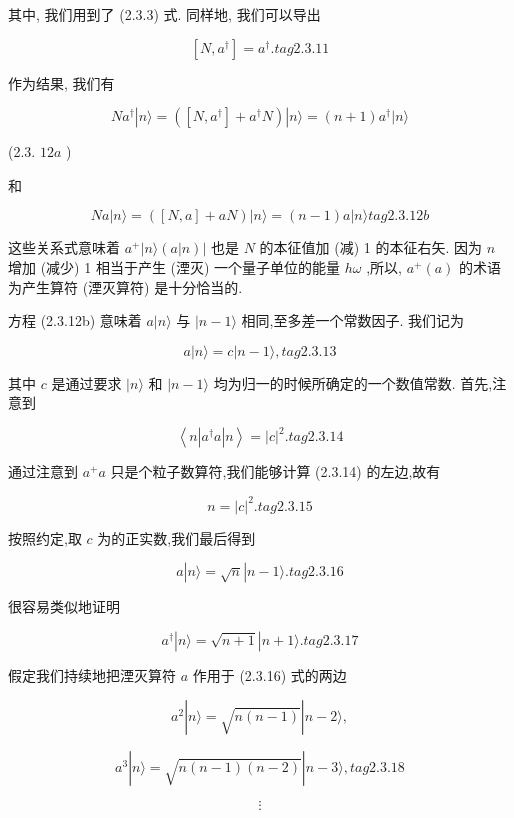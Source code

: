\documentclass[lang=cn,newtx,10pt,scheme=chinese,thmcnt=section]{elegantbook}
\begin{document}
其中, 我们用到了 (2.3.3) 式. 同样地, 我们可以导出

$$
\left\lbrack {N,{a}^{ \dagger }}\right\rbrack = {a}^{ \dagger }. tag{2.3.11}
$$

作为结果, 我们有

$$
N{a}^{ \dagger }\left| {n\rangle = \left( {\left\lbrack {N,{a}^{ \dagger }}\right\rbrack + {a}^{ \dagger }N}\right) }\right| n\rangle = \left( {n + 1}\right) {a}^{ \dagger }|n\rangle
$$

(2.3. ${12a}$ )

和

$$
{Na}\left| {n\rangle = \left( {\left\lbrack {N, a}\right\rbrack + {aN}}\right) }\right| n\rangle = \left( {n - 1}\right) a|n\rangle tag{2.3.12b}
$$

这些关系式意味着 ${a}^{ + }\left| {n\rangle \left( {a | n}\right) }\right|$ 也是 $N$ 的本征值加 (减) 1 的本征右矢. 因为 $n$ 增加 (减少) 1 相当于产生 (湮灭) 一个量子单位的能量 ${h\omega }$ ,所以, ${a}^{ + }\left( a\right)$ 的术语为产生算符 (湮灭算符) 是十分恰当的.

方程 (2.3.12b) 意味着 $a | n\rangle$ 与 $| n - 1\rangle$ 相同,至多差一个常数因子. 我们记为

$$
a\left| {n\rangle = c}\right| n - 1\rangle , tag{2.3.13}
$$

其中 $c$ 是通过要求 $|n\rangle$ 和 $|n - 1\rangle$ 均为归一的时候所确定的一个数值常数. 首先,注意到

$$
\left\langle {n\left| {{a}^{ \dagger }a}\right| n}\right\rangle = {\left| c\right| }^{2}. tag{2.3.14}
$$

通过注意到 ${a}^{ + }a$ 只是个粒子数算符,我们能够计算 (2.3.14) 的左边,故有

$$
n = {\left| c\right| }^{2}. tag{2.3.15}
$$

按照约定,取 $c$ 为的正实数,我们最后得到

$$
a\left| {n\rangle = \sqrt{n}}\right| n - 1\rangle . tag{2.3.16}
$$

很容易类似地证明

$$
{a}^{ \dagger }\left| {n\rangle = \sqrt{n + 1}}\right| n + 1\rangle . tag{2.3.17}
$$

假定我们持续地把湮灭算符 $a$ 作用于 (2.3.16) 式的两边

$$
{a}^{2}\left| {n\rangle = \sqrt{n\left( {n - 1}\right) }}\right| n - 2\rangle ,
$$

$$
{a}^{3}\left| {n\rangle = \sqrt{n\left( {n - 1}\right) \left( {n - 2}\right) }}\right| n - 3\rangle , tag{2.3.18}
$$

$$
\vdots
$$
\end{document}
